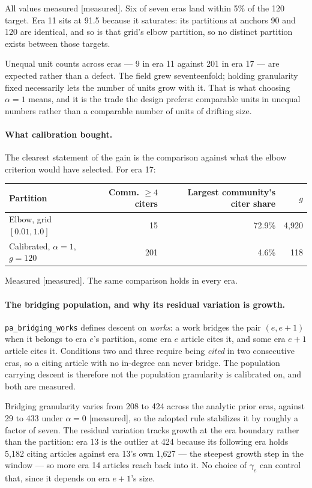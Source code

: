 \documentclass[11pt]{article}
\newcommand{\meas}{{\footnotesize\textsf{[measured]}}}
\newcommand{\code}[1]{\texttt{\small #1}}
\begin{document}
\noindent All values measured \meas{}. Six of seven eras land within 5\% of the 120 target.
Era 11 sits at 91.5 because it saturates: its partitions at anchors 90 and 120 are identical,
and so is that grid's elbow partition, so no distinct partition exists between those targets.

Unequal unit counts across eras --- 9 in era 11 against 201 in era 17 --- are expected rather
than a defect. The field grew seventeenfold; holding granularity fixed necessarily lets the
number of units grow with it. That is what choosing $\alpha = 1$ means, and it is the trade
the design prefers: comparable units in unequal numbers rather than a comparable number of
units of drifting size.

\paragraph{What calibration bought.} The clearest statement of the gain is the comparison
against what the elbow criterion would have selected. For era 17:

\begin{center}
\small
\begin{tabular}{lrrr}
\toprule
Partition & Comm. $\geq 4$ citers & Largest community's citer share & $g$ \\
\midrule
Elbow, grid $[0.01, 1.0]$ & 15 & 72.9\% & 4{,}920 \\
Calibrated, $\alpha=1$, $g=120$ & 201 & 4.6\% & 118 \\
\bottomrule
\end{tabular}
\end{center}

\noindent Measured \meas{}. The same comparison holds in every era.

\paragraph{The bridging population, and why its residual variation is growth.}
\code{pa\_bridging\_works} defines descent on \emph{works}: a work bridges the pair $(e, e+1)$
when it belongs to era $e$'s partition, some era $e$ article cites it, and some era $e+1$
article cites it. Conditions two and three require being \emph{cited} in two consecutive
eras, so a citing article with no in-degree can never bridge. The population carrying descent
is therefore not the population granularity is calibrated on, and both are measured.

Bridging granularity varies from 208 to 424 across the analytic prior eras, against 29 to 433
under $\alpha = 0$ \meas{}, so the adopted rule stabilizes it by roughly a factor of seven.
The residual variation tracks growth at the era boundary rather than the partition: era 13 is
the outlier at 424 because its following era holds 5{,}182 citing articles against era 13's
own 1{,}627 --- the steepest growth step in the window --- so more era 14 articles reach back
into it. No choice of $\gamma_e$ can control that, since it depends on era $e+1$'s size.
\end{document}

